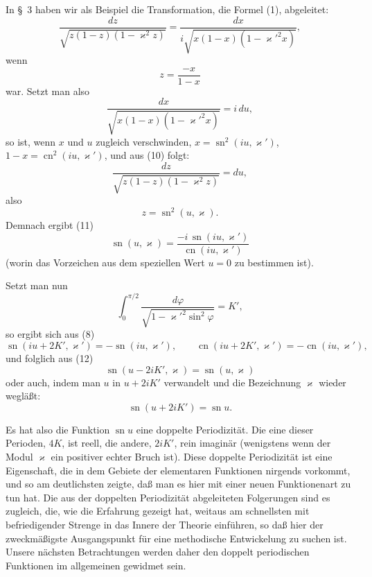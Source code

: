 \documentclass[11pt]{article}
\begin{document}
In \S~3 haben wir als Beispiel die Transformation, die Formel (1), abgeleitet:
\begin{equation}
\frac{dz}{\sqrt{z(1-z)(1-\varkappa^2z)}}
=
\frac{dx}{i\sqrt{x(1-x)(1-\varkappa'^2x)}},
\tag{10}
\end{equation}
wenn
\begin{equation}
z=\frac{-x}{1-x}
\tag{11}
\end{equation}
war. Setzt man also
\[
\frac{dx}{\sqrt{x(1-x)(1-\varkappa'^2x)}}=i\,du,
\]
so ist, wenn $x$ und $u$ zugleich verschwinden, $x=\operatorname{sn}^2(iu,\varkappa')$, $1-x=\operatorname{cn}^2(iu,\varkappa')$, und aus (10) folgt:
\[
\frac{dz}{\sqrt{z(1-z)(1-\varkappa^2z)}}=du,
\]
also
\[
z=\operatorname{sn}^2(u,\varkappa).
\]
Demnach ergibt (11)
\begin{equation}
\operatorname{sn}(u,\varkappa)=
\frac{-i\,\operatorname{sn}(iu,\varkappa')}{\operatorname{cn}(iu,\varkappa')}
\tag{12}
\end{equation}
(worin das Vorzeichen aus dem speziellen Wert $u=0$ zu bestimmen ist).

Setzt man nun
\[
\int_0^{\pi/2}\frac{d\varphi}{\sqrt{1-\varkappa'^2\sin^2\varphi}}=K',
\]
so ergibt sich aus (8)
\[
\operatorname{sn}(iu+2K',\varkappa')=-\operatorname{sn}(iu,\varkappa'),\qquad
\operatorname{cn}(iu+2K',\varkappa')=-\operatorname{cn}(iu,\varkappa'),
\]
und folglich aus (12)
\[
\operatorname{sn}(u-2iK',\varkappa)=\operatorname{sn}(u,\varkappa)
\]
oder auch, indem man $u$ in $u+2iK'$ verwandelt und die Bezeichnung $\varkappa$ wieder wegläßt:
\begin{equation}
\operatorname{sn}(u+2iK')=\operatorname{sn}u.
\tag{13}
\end{equation}

Es hat also die Funktion $\operatorname{sn}u$ eine doppelte Periodizität. Die eine dieser Perioden, $4K$, ist reell, die andere, $2iK'$, rein imaginär (wenigstens wenn der Modul $\varkappa$ ein positiver echter Bruch ist). Diese doppelte Periodizität ist eine Eigenschaft, die in dem Gebiete der elementaren Funktionen nirgends vorkommt, und so am deutlichsten zeigte, daß man es hier mit einer neuen Funktionenart zu tun hat. Die aus der doppelten Periodizität abgeleiteten Folgerungen sind es zugleich, die, wie die Erfahrung gezeigt hat, weitaus am schnellsten mit befriedigender Strenge in das Innere der Theorie einführen, so daß hier der zweckmäßigste Ausgangspunkt für eine methodische Entwickelung zu suchen ist. Unsere nächsten Betrachtungen werden daher den doppelt periodischen Funktionen im allgemeinen gewidmet sein.
\end{document}
